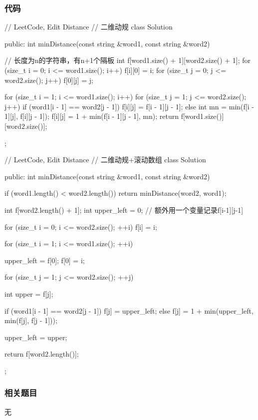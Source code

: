 \subsubsection{代码}
\begin{Code}
// LeetCode, Edit Distance
// 二维动规
class Solution {
public:
    int minDistance(const string &word1, const string &word2) {
        // 长度为n的字符串，有n+1个隔板
        int f[word1.size() + 1][word2.size() + 1];
        for (size_t i = 0; i <= word1.size(); i++)
            f[i][0] = i;
        for (size_t j = 0; j <= word2.size(); j++)
            f[0][j] = j;

        for (size_t i = 1; i <= word1.size(); i++) {
            for (size_t j = 1; j <= word2.size(); j++) {
                if (word1[i - 1] == word2[j - 1])
                    f[i][j] = f[i - 1][j - 1];
                else {
                    int mn = min(f[i - 1][j], f[i][j - 1]);
                    f[i][j] = 1 + min(f[i - 1][j - 1], mn);
                }
            }
        }
        return f[word1.size()][word2.size()];
    }
};
\end{Code}

\begin{Code}
// LeetCode, Edit Distance
// 二维动规+滚动数组
class Solution {
public:
    int minDistance(const string &word1, const string &word2) {
        if (word1.length() < word2.length())
            return minDistance(word2, word1);

        int f[word2.length() + 1];
        int upper_left = 0; // 额外用一个变量记录f[i-1][j-1]

        for (size_t i = 0; i <= word2.size(); ++i)
            f[i] = i;

        for (size_t i = 1; i <= word1.size(); ++i) {
            upper_left = f[0];
            f[0] = i;

            for (size_t j = 1; j <= word2.size(); ++j) {
                int upper = f[j];

                if (word1[i - 1] == word2[j - 1])
                    f[j] = upper_left;
                else
                    f[j] = 1 + min(upper_left, min(f[j], f[j - 1]));

                upper_left = upper;
            }
        }

        return f[word2.length()];
    }
};
\end{Code}


\subsubsection{相关题目}
\begindot
\item 无
\myenddot


